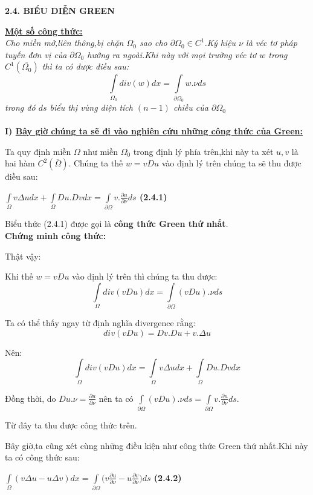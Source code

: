 \begin{center}
\textbf{2.4. BIỂU DIỄN GREEN}
\end{center}

\noindent\textbf{\underline{Một số công thức:}}
\\
\textit{Cho miền mở,liên thông,bị chặn $\Omega_{0}$ sao cho $\partial{\Omega _{0}} \in C^{1}$.Ký hiệu
$\nu$ là véc tơ pháp tuyến đơn vị của $\partial{\Omega_{0}}$ hướng ra ngoài.Khi này với mọi trường véc tơ $w$ trong $ C^1(\overline {\Omega _0 })$
thì ta có được điều sau:}
\[
\int\limits_{\Omega _0 } {div(w)dx}  = \int\limits_{\partial \Omega _0 } {w.} \nu ds\]
\textit{trong đó $ds$ biểu thị vùng diện tích $(n-1)$ chiều của $\partial{\Omega_{0}}$}
\\
\\
\textbf{I) \underline{Bây giờ chúng ta sẽ đi vào nghiên cứu những công thức của Green:}}

Ta quy định miền $\Omega$ như miền $\Omega_{0}$ trong định lý phía trên,khi này ta xét $u,v$ là hai hàm $C^2 (\overline \Omega  )$. Chúng ta thế $w=vDu$ vào định lý trên chúng ta sẽ thu được điều sau:
\begin{center}
\textbf{$\int\limits_\Omega  {v\Delta udx + \int\limits_\Omega  {Du.Dvdx = \int\limits_{\partial \Omega } {v.\frac{{\partial u}}
{{\partial \nu }}} } } ds$       (2.4.1)}
\end{center}

Biểu thức (2.4.1) được gọi là \textbf{công thức Green thứ nhất}.
\\
\textbf{Chứng minh công thức:}

Thật vậy:

Khi thế $w=vDu$ vào định lý trên thì chúng ta thu được:
\[
\int\limits_\Omega  {div(vDu)dx}  = \int\limits_{\partial \Omega } {(vDu).} \nu ds
\]

Ta có thể thấy ngay từ định nghĩa divergence rằng:
\[div(vDu) = Dv.Du + v.\Delta u\]

Nên: 
\[
\int\limits_\Omega  {div(vDu)dx}  = \int\limits_\Omega  {v\Delta udx + \int\limits_\Omega  {Du.Dvdx} } 
\]

Đồng thời, do $
Du.\nu  = \frac{{\partial u}}
{{\partial \nu }}
$ nên ta có $
\int\limits_{\partial \Omega } {(vDu).\nu ds}  = \int\limits_{\partial \Omega } {v.\frac{{\partial u}}
{{\partial \nu }}} ds.
$

Từ đây ta thu được công thức trên.

Bây giờ,ta cũng xét cùng những điều kiện như công thức Green thứ nhất.Khi này ta có công thức sau:
\begin{center}
\textbf{$
\int\limits_\Omega  {(v\Delta u - u\Delta v)dx = \int\limits_{\partial \Omega } {(v} } \frac{{\partial u}}
{{\partial \nu }} - u\frac{{\partial v}}
{{\partial \nu }})ds
$ (2.4.2)}
\end{center}

